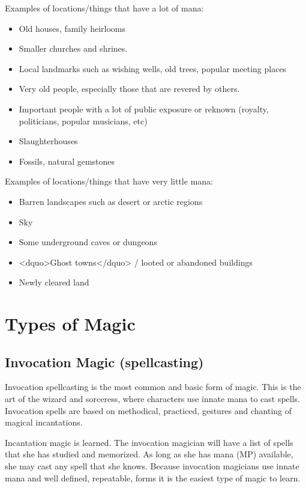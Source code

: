 Examples of locations/things that have a lot of mana:
\begin{itemize}
\item Old houses, family heirlooms
\item Smaller churches and shrines.
\item Local landmarks such as wishing wells, old trees, popular meeting places
\item Very old people, especially those that are revered by others.
\item Important people with a lot of public exposure or reknown
  (royalty, politicians, popular musicians, etc)
\item Slaughterhouses
\item Fossils, natural gemstones
\end{itemize}

Examples of locations/things that have very little mana:
\begin{itemize}
\item Barren landscapes such as desert or arctic regions
\item Sky
\item Some underground caves or dungeons
\item <dquo>Ghost towns</dquo> / looted or abandoned buildings
\item Newly cleared land
\end{itemize}

\section{Types of Magic}

\subsection{Invocation Magic (spellcasting)}

Invocation spellcasting is the most common and basic form of magic.
This is the art of the wizard and sorceress, where characters use
innate mana to cast spells.  Invocation spells are based on
methodical, practiced, gestures and chanting of magical incantations.

Incantation magic is learned.  The invocation magician will have a
list of spells that she has studied and memorized.  As long as she has
mana (MP) available, she may cast any spell that she knows.  Because
invocation magicians use innate mana and well defined, repeatable,
forms it is the easiest type of magic to learn.

